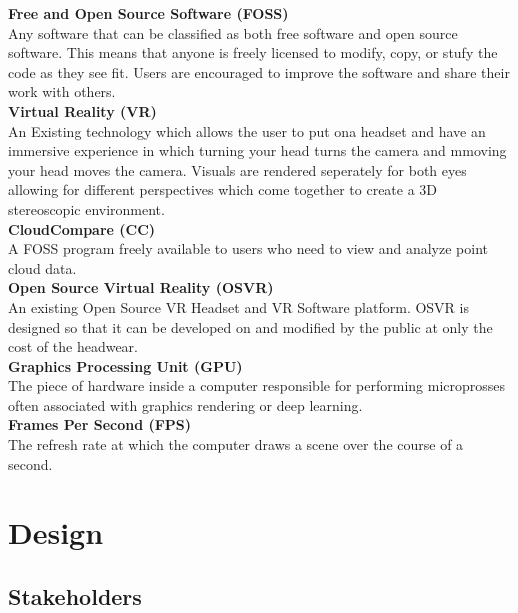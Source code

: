 {\parindent0pt
\textbf{Free and Open Source Software (FOSS)}\\

Any software that can be classified as both free software and open source software.
This means that anyone is freely licensed to modify, copy, or stufy the code as they see fit.
Users are encouraged to improve the software and share their work with others.\\

\textbf{Virtual Reality (VR)}\\

An Existing technology which allows the user to put ona headset and have an immersive experience in which turning your  head turns the camera and mmoving your head moves the camera.
Visuals are rendered seperately for both eyes allowing for different perspectives which come together to create a 3D stereoscopic environment.\\

\textbf{CloudCompare (CC)}\\

A FOSS program freely available to users who need to view and analyze point cloud data.\\

\textbf{Open Source Virtual Reality (OSVR)}\\

An existing Open Source VR Headset and VR Software platform.
OSVR is designed so that it can be developed on and modified by the public at only the cost of the headwear.\\

\textbf{Graphics Processing Unit (GPU)}\\

The piece of hardware inside a computer responsible for performing microprosses often associated with graphics rendering or deep learning.\\

\textbf{Frames Per Second (FPS)}\\

The refresh rate at which the computer draws a scene over the course of a second.\\
}

\section{Design}

\subsection{Stakeholders}

